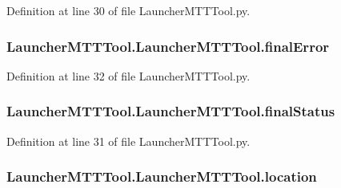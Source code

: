 Definition at line 30 of file Launcher\-M\-T\-T\-Tool.\-py.

\hypertarget{class_launcher_m_t_t_tool_1_1_launcher_m_t_t_tool_a607ea8851059a23f64f5b1ef4590109e}{
\subsubsection[{final\-Error}]{\setlength{\rightskip}{0pt plus 5cm}Launcher\-M\-T\-T\-Tool.\-Launcher\-M\-T\-T\-Tool.\-final\-Error}}\label{class_launcher_m_t_t_tool_1_1_launcher_m_t_t_tool_a607ea8851059a23f64f5b1ef4590109e}


Definition at line 32 of file Launcher\-M\-T\-T\-Tool.\-py.

\hypertarget{class_launcher_m_t_t_tool_1_1_launcher_m_t_t_tool_a24a3038f22807231f60be1efd39f7bcb}{
\subsubsection[{final\-Status}]{\setlength{\rightskip}{0pt plus 5cm}Launcher\-M\-T\-T\-Tool.\-Launcher\-M\-T\-T\-Tool.\-final\-Status}}\label{class_launcher_m_t_t_tool_1_1_launcher_m_t_t_tool_a24a3038f22807231f60be1efd39f7bcb}


Definition at line 31 of file Launcher\-M\-T\-T\-Tool.\-py.

\hypertarget{class_launcher_m_t_t_tool_1_1_launcher_m_t_t_tool_a13b93dfdaa7c433967c808d9bf54dcf9}{
\subsubsection[{location}]{\setlength{\rightskip}{0pt plus 5cm}Launcher\-M\-T\-T\-Tool.\-Launcher\-M\-T\-T\-Tool.\-location}}\label{class_launcher_m_t_t_tool_1_1_launcher_m_t_t_tool_a13b93dfdaa7c433967c808d9bf54dcf9}


